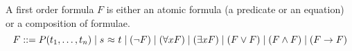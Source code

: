 
\begin{definition}\label{def:first-order}
A {\myem first order formula} $F$ is either an 
{\myem atomic formula} (a predicate or an equation)
or a composition of formulae.
%
\[
 F ::= P(t_1,\ldots,t_n) \mid
	s\ {\mathsf \approx}\ t \mid
	(\lnot F) \mid 
	(\forall x F) \mid
	(\exists x F) \mid
	(F\lor F) \mid
	(F\land F) \mid
	(F\rightarrow F)
\]
\end{definition}